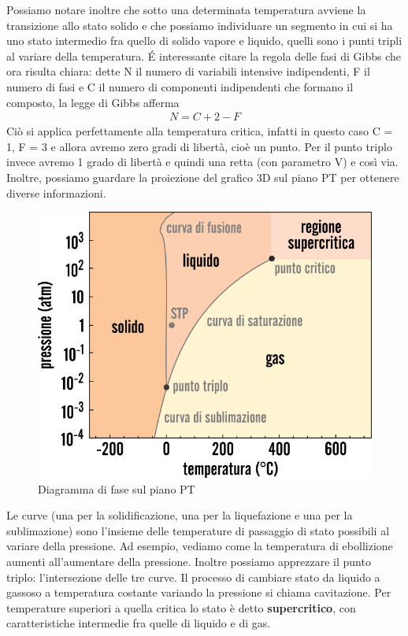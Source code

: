 \documentclass[10pt,a4paper]{article}
\begin{document}
\FloatBarrier
Possiamo notare inoltre che sotto una determinata temperatura avviene la transizione allo stato solido e che possiamo individuare un segmento in cui si ha uno stato intermedio fra quello di solido vapore e liquido, quelli sono i punti tripli al variare della temperatura. \'{E} interessante citare la regola delle fasi di Gibbs che ora risulta chiara: dette N il numero di variabili intensive indipendenti, F il numero di fasi e C il numero di componenti indipendenti che formano il composto, la legge di Gibbs afferma
\begin{align*} 
	N = C + 2 - F
\end{align*}  
Ciò si applica perfettamente alla temperatura critica, infatti in questo caso C = 1, F = 3 e allora avremo zero gradi di libertà, cioè un punto. Per il punto triplo invece avremo 1 grado di libertà e quindi una retta (con parametro V) e così via.\\
Inoltre, possiamo guardare la proiezione del grafico 3D sul piano PT per ottenere diverse informazioni. 
\begin{figure}[h!]
	\centering
	\includegraphics[width=0.6\linewidth]{../images/diagrammadifasePT}
	\caption{Diagramma di fase sul piano PT}
	\label{fig:diagrammadifasept}
\end{figure}
\FloatBarrier
Le curve (una per la solidificazione, una per la liquefazione e una per la sublimazione) sono l'insieme delle temperature di passaggio di stato possibili al variare della pressione. Ad esempio, vediamo come la temperatura di ebollizione aumenti all'aumentare della pressione. Inoltre possiamo apprezzare il punto triplo: l'intersezione delle tre curve. Il processo di cambiare stato da liquido a gassoso a temperatura costante variando la pressione si chiama cavitazione. Per temperature superiori a quella critica lo stato è detto \textbf{supercritico}, con caratteristiche intermedie fra quelle di liquido e di gas. 
\end{document}
